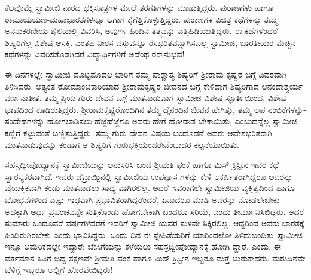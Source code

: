ಕೆಲವೊಮ್ಮೆ ಸ್ವಾಮೀಜಿ ನಾರದ ಭಕ್ತಿಸೂತ್ರಗಳ ಮೇಲೆ ತರಗತಿಗಳನ್ನು ಮಾಡುತ್ತಿದ್ದರು. ಪುರಾಣಗಳು ಹಾಗೂ ರಾಮಾಯಯಣ-ಮಹಾಭಾರತಗಳನ್ನೂ ಆಗಾಗ ಕೈಗೆತ್ತಿಕೊಳ್ಳುತ್ತಿದ್ದರು. ಪುರಾಣಗಳ ವಿಚಿತ್ರ ಕಥೆಗಳನ್ನು ತಮ್ಮ ಅನನುಕರಣೀಯ ಶೈಲಿಯಲ್ಲಿ ವಿವರಿಸಿ, ಅವುಗಳ ಹಿಂದಿನ ತತ್ತ್ವವನ್ನು ಎತ್ತಿಹಿಡಿಯುತ್ತಿದ್ದರು. ಈ ಕಥೆಗಳೆಂದರೆ ಶಿಷ್ಯರಿಗೆಲ್ಲ ವಿಶೇಷ ಆಸಕ್ತಿ. ಎಂತಹ ನೀರಸ ವಸ್ತುವನ್ನೂ ರಸಭರಿತವನ್ನಾಗಿಸಬಲ್ಲ ಸ್ವಾಮೀಜಿ, ಭಾರತೀಯರ ಮೆಚ್ಚಿನ ಕಥೆಗಳನ್ನು ವಿವರಿಸತೊಡಗಿದರೆ ವಿದ್ಯಾರ್ಥಿಗಳಿಗೆ ಅದೆಂಥ ರಸಾನುಭವ!

ಈ ದಿನಗಳಲ್ಲೇ ಸ್ವಾಮೀಜಿ ಮೊಟ್ಟಮೊದಲ ಬಾರಿಗೆ ತಮ್ಮ ಪಾಶ್ಚಾತ್ಯ ಶಿಷ್ಯರಿಗೆ ಶ್ರೀರಾಮ ಕೃಷ್ಣರ ಬಗ್ಗೆ ವಿವರವಾಗಿ ತಿಳಿಸಿದರು. ಅತ್ಯಂತ ರೋಮಾಂಚಕಾರಿಯಾದ ಶ್ರೀರಾಮಕೃಷ್ಣರ ಜೀವನದ ಬಗ್ಗೆ ಕೇಳಿದಾಗ ಶಿಷ್ಯರಿಗಾದ ಆನಂದಾಶ್ಚರ್ಯ ವರ್ಣನಾತೀತ. ತಮ್ಮ ಪ್ರಿಯ ಗುರು ದೇವನ ಬಗ್ಗೆ ಮಾತನಾಡುವಾಗ ಸ್ವಾಮೀಜಿ ವಿಶೇಷ ಸ್ಫೂರ್ತಿಯಿಂದ, ವಿಶೇಷ ಭಾವದಿಂದ ಕೂಡಿರುತ್ತಿದ್ದರು. ಶ್ರೀರಾಮಕೃಷ್ಣರೊಂದಿಗಿನ ತಮ್ಮ ದೈನಂದಿನ ಜೀವನ ಹೇಗಿತ್ತು, ತಮ್ಮ ಅಪ ನಂಬಿಕೆಗಳನ್ನು-ಸಂದೇಹಗಳನ್ನು ಹೋಗಲಾಡಿಸಲು ಹೆಜ್ಜೆಹೆಜ್ಜೆಗೂ ಅವರು ಹೇಗೆ ಹೋರಾಡ ಬೇಕಾಯಿತು, ಎಂಬುದನ್ನೆಲ್ಲ ಸ್ವಾಮೀಜಿ ಕಣ್ಣಿಗೆ ಕಟ್ಟುವಂತೆ ಬಣ್ಣಿಸುತ್ತಿದ್ದರು. ತಮ್ಮ ಗುರು ದೇವನ ವಿಷಯ ಬಂದೊಡನೆ ಅವರು ಆವೇಶಭರಿತರಾಗಿ ಮಾತನಾಡುವುದನ್ನು ಕಂಡಾಗ ಆ ಶಿಷ್ಯರಿಗೆ ಗುರುಭಕ್ತಿಯೆಂದರೇನೆಂಬುದರ ಕಲ್ಪನೆಯಾಯಿತು.

ಸಹಸ್ರದ್ವೀಪೋದ್ಯಾನಕ್ಕೆ ಸ್ವಾಮೀಜಿಯನ್ನು ಅನುಸರಿಸಿ ಬಂದ ಶ್ರೀಮತಿ ಫಂಕೆ ಹಾಗೂ ಮಿಸ್ ಕ್ರಿಸ್ಟೀನ ಇವರ ಕಥೆ ಸ್ವಾರಸ್ಯಕರವಾಗಿದೆ. ಇವರು ಡೆಟ್ರಾಯ್ಟಿನಲ್ಲಿ ಸ್ವಾಮೀಜಿಯ ಉಪನ್ಯಾಸ ಗಳನ್ನು ಕೇಳಿ ಆಕರ್ಷಿತರಾಗಿದ್ದರೂ ಅವರನ್ನು ವೈಯಕ್ತಿಕವಾಗಿ ಕಂಡು ಮಾತನಾಡಲು ಸಾಧ್ಯ ವಾಗಿರಲಿಲ್ಲ. ಆದರೆ ಇವರಾಗಲೇ ಸ್ವಾಮೀಜಿಯ ವ್ಯಕ್ತಿತ್ವದಿಂದ ಹಾಗೂ ಬೋಧನೆಗಳಿಂದ ಎಷ್ಟು ಗಾಢವಾಗಿ ಪ್ರಭಾವಿತರಾಗಿದ್ದರೆಂದರೆ, ಏನಾದರೂ ಮಾಡಿ ಅವರನ್ನು ನೋಡಲೇಬೇಕು– ಅದಕ್ಕಾಗಿ ಅರ್ಧ ಪ್ರಪಂಚವನ್ನೇ ಸುತ್ತಿಕೊಂಡು ಹೋಗಬೇಕಾಗಿ ಬಂದರೂ ಸರಿಯೆ, ಎಂದು ತೀರ್ಮಾನಿಸಿಬಿಟ್ಟರು. ಆದರೆ ಸುಮಾರು ಒಂದೂವರೆ ವರ್ಷಗಳವರೆಗೆ ಇವರಿಗೆ ಸ್ವಾಮೀಜಿ ಯವರ ಸುಳಿವೇ ಸಿಕ್ಕಿರಲಿಲ್ಲ. ಆದ್ದರಿಂದ ಅವರು ಭಾರತಕ್ಕೆ ಹಿಂದಿರುಗಿರಬೇಕು ಎಂದು ಭಾವಿಸಿದ್ದರು. ಒಂದು ದಿನ ಈ ಸ್ನೇಹಿತೆಯರಿಗೆ ಯಾರಿಂದಲೋ ತಿಳಿದುಬಂದಿತು–ಸ್ವಾಮೀಜಿ ಇನ್ನೂ ಅಮೆರಿಕದಲ್ಲೇ ಇದ್ದಾರೆ; ಬೇಸಿಗೆಯನ್ನು ಕಳೆಯಲು ಸಹಸ್ರದ್ವೀಪೋದ್ಯಾನಕ್ಕೆ ಹೋಗಿ ದ್ದಾರೆ, ಎಂದು. ಈ ವರ್ತಮಾನ ಕಿವಿಗೆ ಬಿದ್ದ ತಕ್ಷಣವೇ ಶ್ರೀಮತಿ ಫಂಕೆ ಹಾಗೂ ಮಿಸ್ ಕ್ರಿಸ್ಟೀನ ಇಬ್ಬರೂ ಮತ್ತೆ ಚುರುಕಾದರು. ಮರುದಿನವೇ ಬೆಳಿಗ್ಗೆ ಇಬ್ಬರೂ ಅಲ್ಲಿಗೆ ಹೊರಟೇಬಿಟ್ಟರು!

